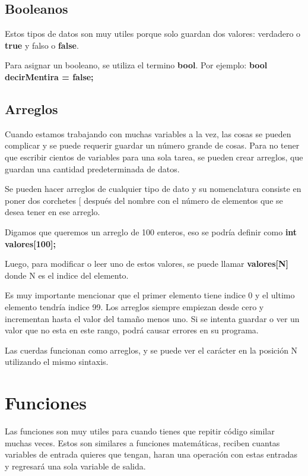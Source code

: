 \documentclass{article}
\begin{document}
\subsection{Booleanos}

Estos tipos de datos son muy utiles porque solo guardan dos valores: verdadero o \textbf{true} y falso o \textbf{false}.

Para asignar un booleano, se utiliza el termino \textbf{bool}. Por ejemplo: \textbf{bool decirMentira = false;}

\subsection{Arreglos}

Cuando estamos trabajando con muchas variables a la vez, las cosas se pueden complicar y se puede requerir guardar un número grande de cosas. Para no tener que escribir cientos de variables para una sola tarea, se pueden crear arreglos, que guardan una cantidad predeterminada de datos.

Se pueden hacer arreglos de cualquier tipo de dato y su nomenclatura consiste en poner dos corchetes $[$ después del nombre con el número de elementos que se desea tener en ese arreglo.

Digamos que queremos un arreglo de 100 enteros, eso se podría definir como \textbf{int valores[100];}

Luego, para modificar o leer uno de estos valores, se puede llamar \textbf{valores[N]} donde N es el indice del elemento.

Es muy importante mencionar que el primer elemento tiene indice 0 y el ultimo elemento tendría indice 99. Los arreglos siempre empiezan desde cero y incrementan hasta el valor del tamaño menos uno. Si se intenta guardar o ver un valor que no esta en este rango, podrá causar errores en su programa.

Las cuerdas funcionan como arreglos, y se puede ver el carácter en la posición N utilizando el mismo sintaxis.

\section{Funciones}

Las funciones son muy utiles para cuando tienes que repitir código similar muchas veces. Estos son similares a funciones matemáticas, reciben cuantas variables de entrada quieres que tengan, haran una operación con estas entradas y regresará una sola variable de salida.
\end{document}
